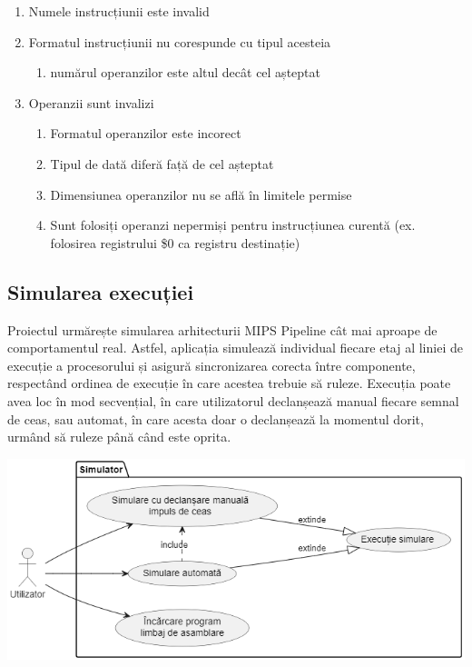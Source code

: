 \documentclass{article}
\begin{document}
\begin{tcolorbox}[colback=blue!5!white,colframe=violet!75!black,title=Cazuri de validare]
    \begin{enumerate}
        \item Numele instrucțiunii este invalid
        \item Formatul instrucțiunii nu corespunde cu tipul acesteia
        \begin{enumerate}
            \item numărul operanzilor este altul decât cel așteptat
        \end{enumerate}
        \item Operanzii sunt invalizi
        \begin{enumerate}
            \item Formatul operanzilor este incorect
            \item Tipul de dată diferă față de cel așteptat
            \item Dimensiunea operanzilor nu se află în limitele permise
            \item Sunt folosiți operanzi nepermiși pentru instrucțiunea curentă (ex. folosirea registrului \$0 ca registru destinație)
        \end{enumerate}
    \end{enumerate}
\end{tcolorbox}

\label{subsec:intro}
\subsection{Simularea execuției}
Proiectul urmărește simularea arhitecturii MIPS Pipeline cât mai aproape de comportamentul real. Astfel, aplicația simulează individual fiecare etaj al liniei de execuție a procesorului și asigură sincronizarea corecta între componente, respectând ordinea de execuție în care acestea trebuie să ruleze. Execuția poate avea loc în mod secvențial, în care utilizatorul declanșează manual fiecare semnal de ceas, sau automat, în care acesta doar o declanșează la momentul dorit, urmând să ruleze până când este oprita.

\begin{tcolorbox}[colback=white!5!white,colframe=violet!75!black,title=Cazuri de utilizare]
\includegraphics[scale=0.80]{img/UseCaseDiagram.png}
\end{tcolorbox}
\end{document}
